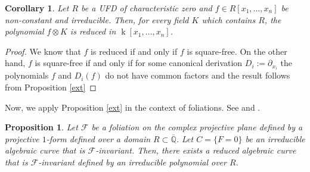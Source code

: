 \documentclass[reqno,oneside,11pt]{amsart}
\newtheorem{cor}[thm]{Corollary}
\newtheorem{prop}[thm]{Proposition}
\theoremstyle{definition}
\DeclareMathOperator{\field}{k}
\begin{document}
\begin{cor} 
    Let $R$ be a UFD of characteristic zero and $f \in R[x_1,\ldots,x_n]$ be non-constant and irreducible. Then, for every field $K$ which contains $R$, the polynomial $f\otimes K$ is reduced in $\field[x_1,\ldots,x_n]$.
\end{cor}

\begin{proof} 
    We know that $f$ is reduced if and only if $f$ is square-free. On the other hand, $f$ is square-free if and only if for some canonical derivation $D_i := \partial_{x_i}$ the polynomials $f$ and $D_i(f)$ do not have common factors and the result follows from Proposition \ref{ext}   
\end{proof}

Now, we apply Proposition \ref{ext} in the context of foliations. See \cite[Theorem 2.2]{coutinho2018bounding} and \cite[Proposition]{man1997rational}.
\begin{prop}\label{coefi} 
    Let $\mathcal{F}$ be a foliation on the complex projective plane defined by a projective $1$-form defined over a domain $R\subset \overline{\mathbb{Q}}$. Let $C = \{F = 0\}$ be an irreducible algebraic curve that is $\mathcal{F}$-invariant. Then, there exists a reduced algebraic curve that is $\mathcal{F}$-invariant defined by an irreducible polynomial over $R$.
\end{prop}
\end{document}
